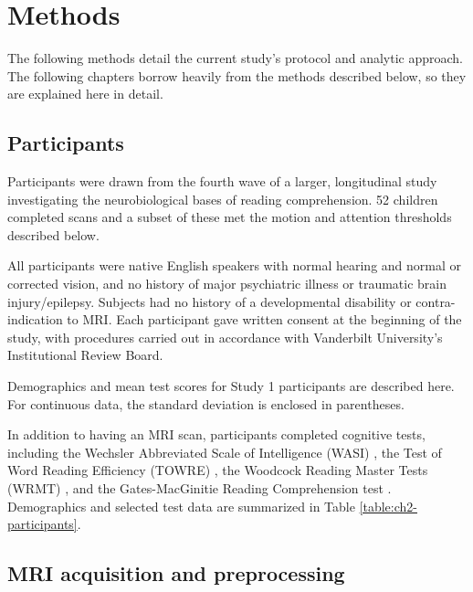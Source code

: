 \section{Methods}

The following methods detail the current study's protocol and analytic approach. The following chapters borrow heavily from the methods described below, so they are explained here in detail. 

\subsection{Participants}

Participants were drawn from the fourth wave of a larger, longitudinal study investigating the neurobiological bases of reading comprehension. 52 children completed scans and a subset of these met the motion and attention thresholds described below.

All participants were native English speakers with normal hearing and normal or corrected vision, and no history of major psychiatric illness or traumatic brain injury/epilepsy. Subjects had no history of a developmental disability or contra-indication to MRI.  Each participant gave written consent at the beginning of the study, with procedures carried out in accordance with Vanderbilt University’s Institutional Review Board.

\begin{table}
    \renewcommand{\tabcolsep}{0.09cm}
    \centering
    
    \caption[Participant demographics]{Demographics and mean test scores for Study 1 participants are described here. For continuous data, the standard deviation is enclosed in parentheses.}
    \label{table:ch2-participants}
\end{table}

In addition to having an MRI scan, participants completed cognitive tests, including the Wechsler Abbreviated Scale of Intelligence (WASI) \citep{Kaplan1999}, the Test of Word Reading Efficiency (TOWRE) \citep{Torgesen2012}, the Woodcock Reading Master Tests (WRMT) \citep{Woodcock1998}, and the Gates-MacGinitie Reading Comprehension test \citep{MacGinitie2000}. Demographics and selected test data are summarized in Table \ref{table:ch2-participants}.

\subsection{MRI acquisition and preprocessing}


